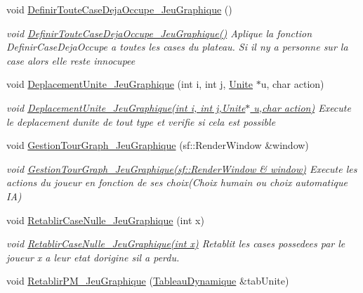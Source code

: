 \begin{DoxyCompactItemize}
void \hyperlink{classJeu__graphique_a5faaece89347dc9c0a6ba9ec8377b53a}{Definir\+Toute\+Case\+Deja\+Occupe\+\_\+\+Jeu\+Graphique} ()
\begin{DoxyCompactList}\small\item\em void \hyperlink{classJeu__graphique_a5faaece89347dc9c0a6ba9ec8377b53a}{Definir\+Toute\+Case\+Deja\+Occupe\+\_\+\+Jeu\+Graphique()} Aplique la fonction Definir\+Case\+Deja\+Occupe a toutes les cases du plateau. Si il n\textquotesingle{}y a personne sur la case alors elle reste innocupee \end{DoxyCompactList}\item 
void \hyperlink{classJeu__graphique_acde0d8de2f0990f3ab3f2defe2c09c27}{Deplacement\+Unite\+\_\+\+Jeu\+Graphique} (int i, int j, \hyperlink{classUnite}{Unite} $\ast$u, char action)
\begin{DoxyCompactList}\small\item\em void \hyperlink{classJeu__graphique_acde0d8de2f0990f3ab3f2defe2c09c27}{Deplacement\+Unite\+\_\+\+Jeu\+Graphique(int i, int j,\+Unite$\ast$ u,char action)} Execute le deplacement d\textquotesingle{}unite de tout type et verifie si cela est possible \end{DoxyCompactList}\item 
void \hyperlink{classJeu__graphique_a70e411f6d6875e871939e99f35638486}{Gestion\+Tour\+Graph\+\_\+\+Jeu\+Graphique} (sf\+::\+Render\+Window \&window)
\begin{DoxyCompactList}\small\item\em void \hyperlink{classJeu__graphique_a70e411f6d6875e871939e99f35638486}{Gestion\+Tour\+Graph\+\_\+\+Jeu\+Graphique(sf\+::\+Render\+Window \& window)} Execute les actions du joueur en fonction de ses choix(\+Choix humain ou choix automatique I\+A) \end{DoxyCompactList}\item 
void \hyperlink{classJeu__graphique_aec9f4feaa383627bafe2ac2d66aae2e9}{Retablir\+Case\+Nulle\+\_\+\+Jeu\+Graphique} (int x)
\begin{DoxyCompactList}\small\item\em void \hyperlink{classJeu__graphique_aec9f4feaa383627bafe2ac2d66aae2e9}{Retablir\+Case\+Nulle\+\_\+\+Jeu\+Graphique(int x)} Retablit les cases possedees par le joueur x a leur etat d\textquotesingle{}origine s\textquotesingle{}il a perdu. \end{DoxyCompactList}\item 
void \hyperlink{classJeu__graphique_a780cecdb8248b4e5612895b026a61a5a}{Retablir\+P\+M\+\_\+\+Jeu\+Graphique} (\hyperlink{classTableauDynamique}{Tableau\+Dynamique} \&tab\+Unite)

\end{DoxyCompactItemize}
